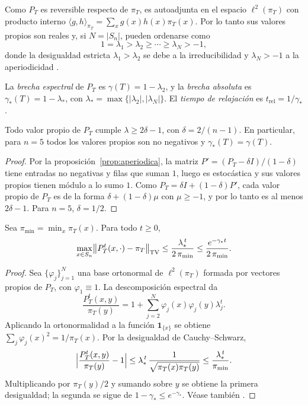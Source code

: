 Como \(P_T\) es reversible respecto de \(\pi_T\), es autoadjunta en el
espacio \(\ell^2(\pi_T)\) con producto interno
\(\langle g,h\rangle_{\pi_T}=\sum_x g(x)h(x)\pi_T(x)\). Por lo tanto sus
valores propios son reales y, si \(N=|S_n|\), pueden ordenarse como
\[
1=\lambda_1>\lambda_2\ge\cdots\ge\lambda_N>-1,
\]
donde la desigualdad estricta \(\lambda_1>\lambda_2\) se debe a la
irreducibilidad y \(\lambda_N>-1\) a la aperiodicidad
\citep[cap.~12]{levin2017}.

\begin{definicion}
\label{def:brecha}
La \emph{brecha espectral} de \(P_T\) es
\(\gamma(T)=1-\lambda_2\), y la \emph{brecha absoluta} es
\(\gamma_\ast(T)=1-\lambda_\ast\), con
\(\lambda_\ast=\max\{|\lambda_2|,|\lambda_N|\}\). El \emph{tiempo de
relajación} es \(t_{\mathrm{rel}}=1/\gamma_\ast\).
\end{definicion}

\begin{proposicion}
\label{prop:espectro_lazy}
Todo valor propio de \(P_T\) cumple \(\lambda\ge 2\delta-1\), con
\(\delta=2/(n-1)\). En particular, para \(n=5\) todos los valores propios
son no negativos y \(\gamma_\ast(T)=\gamma(T)\).
\end{proposicion}

\begin{proof}
Por la proposición~\ref{prop:aperiodica}, la matriz
\(P'=(P_T-\delta I)/(1-\delta)\) tiene entradas no negativas y filas que
suman \(1\), luego es estocástica y sus valores propios tienen módulo
a lo sumo \(1\). Como \(P_T=\delta I+(1-\delta)P'\), cada valor propio de
\(P_T\) es de la forma \(\delta+(1-\delta)\mu\) con \(\mu\ge-1\), y por
lo tanto es al menos \(2\delta-1\). Para \(n=5\), \(\delta=1/2\).
\end{proof}

\begin{proposicion}
\label{prop:cota_espectral}
Sea \(\pi_{\min}=\min_x\pi_T(x)\). Para todo \(t\ge 0\),
\[
\max_{x\in S_n}\bigl\|P_T^t(x,\cdot)-\pi_T\bigr\|_{\mathrm{TV}}
\le\frac{\lambda_\ast^{\,t}}{2\,\pi_{\min}}
\le\frac{e^{-\gamma_\ast t}}{2\,\pi_{\min}}.
\]
\end{proposicion}

\begin{proof}
Sea \(\{\varphi_j\}_{j=1}^N\) una base ortonormal de \(\ell^2(\pi_T)\)
formada por vectores propios de \(P_T\), con \(\varphi_1\equiv1\). La
descomposición espectral da
\[
\frac{P_T^t(x,y)}{\pi_T(y)}=1+\sum_{j=2}^N\varphi_j(x)\varphi_j(y)\lambda_j^t.
\]
Aplicando la ortonormalidad a la función \(\mathbf 1_{\{x\}}\) se
obtiene \(\sum_{j}\varphi_j(x)^2=1/\pi_T(x)\). Por la desigualdad de
Cauchy--Schwarz,
\[
\Bigl|\frac{P_T^t(x,y)}{\pi_T(y)}-1\Bigr|
\le\lambda_\ast^{\,t}\,\frac{1}{\sqrt{\pi_T(x)\pi_T(y)}}
\le\frac{\lambda_\ast^{\,t}}{\pi_{\min}}.
\]
Multiplicando por \(\pi_T(y)/2\) y sumando sobre \(y\) se obtiene la
primera desigualdad; la segunda se sigue de
\(1-\gamma_\ast\le e^{-\gamma_\ast}\). Véase también
\citet[cap.~12]{levin2017}.
\end{proof}

